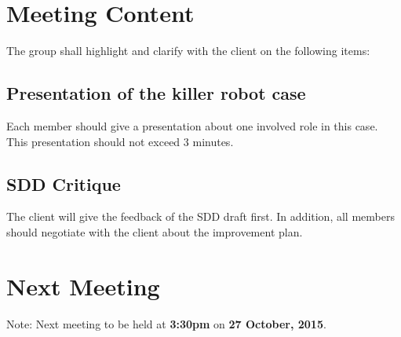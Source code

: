 \documentclass[a4paper] {article}
\begin{document}
	\section{Meeting Content}
	The group shall highlight and clarify with the client on the following items:
	
	\subsection{Presentation of the killer robot case}
   	Each member should give a presentation about one involved role in this case. This presentation should not exceed 3 minutes.
   	
	
	\subsection{SDD Critique}
	
	The client will give the feedback of the SDD draft first. In addition, all members should negotiate with the client about the improvement plan.
	
   	
   
   
	\section{Next Meeting}
	Note: Next meeting to be held at \textbf{3:30pm} on \textbf {27 October, 2015}. 
	
\end{document}
